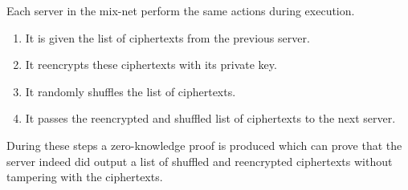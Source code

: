 
Each server in the mix-net perform the same actions during execution.

\begin{enumerate}
\item It is given the list of ciphertexts from the previous server.
\item It reencrypts these ciphertexts with its private key.
\item It randomly shuffles the list of ciphertexts.
\item It passes the reencrypted and shuffled list of ciphertexts to the next server.
\end{enumerate}

During these steps a zero-knowledge proof is produced which can prove that the server indeed did output a list of shuffled and reencrypted ciphertexts without tampering with the ciphertexts.

\begin{center}
\end{center}
